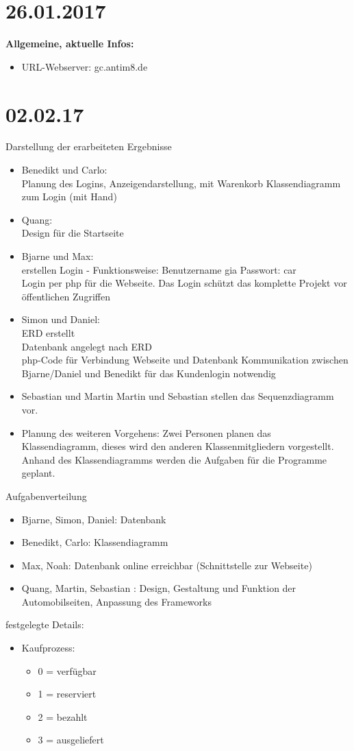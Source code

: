 \documentclass[11pt,a4paper]{scrbook}
\begin{document}
\section*{26.01.2017}
\textbf{Allgemeine, aktuelle Infos:}
\begin{itemize}
\item URL-Webserver: gc.antim8.de
\end{itemize}
\section*{02.02.17}
\Large{Darstellung der erarbeiteten Ergebnisse}
\normalsize
\begin{itemize}
\item Benedikt und Carlo: \\
Planung des Logins, Anzeigendarstellung, mit Warenkorb
Klassendiagramm zum Login (mit Hand)
\item Quang: \\
Design für die Startseite
\item Bjarne und Max: \\
erstellen Login - Funktionsweise: Benutzername gia  Passwort:  car\\
Login per php für die Webseite. Das Login schützt das komplette Projekt vor öffentlichen Zugriffen
\item Simon und Daniel: \\
ERD erstellt\\
Datenbank angelegt nach ERD \\
php-Code für Verbindung Webseite und Datenbank
Kommunikation zwischen Bjarne/Daniel und Benedikt für das Kundenlogin notwendig
\item Sebastian und Martin
Martin und Sebastian stellen das Sequenzdiagramm vor.
\item Planung des weiteren Vorgehens:
Zwei Personen planen das Klassendiagramm, dieses wird den anderen Klassenmitgliedern vorgestellt. Anhand des Klassendiagramms werden die Aufgaben für die Programme geplant.
\end{itemize}
\vspace*{1cm}
\Large{Aufgabenverteilung}
\normalsize
\begin{itemize}
\item Bjarne, Simon, Daniel: Datenbank
\item Benedikt, Carlo: Klassendiagramm
\item Max, Noah: Datenbank online erreichbar (Schnittstelle zur Webseite)
\item Quang, Martin, Sebastian : Design, Gestaltung und Funktion der Automobilseiten, Anpassung des Frameworks
\end{itemize}
\newpage
\vspace*{1cm}
\Large{festgelegte Details:}
\normalsize
\begin{itemize}
\item Kaufprozess:
\begin{itemize}
\item 0 = verfügbar
\item 1 = reserviert
\item 2 = bezahlt
\item 3 = ausgeliefert
\end{itemize}
\end{itemize}
\end{document}
